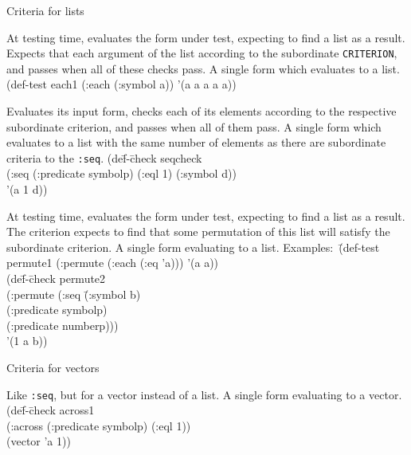 \begin{criteriaGroup}{Criteria for lists}{}

{At testing time, evaluates the form under test, expecting to find a
  list as a result.  Expects that each argument of the list according
  to the subordinate \texttt{CRITERION}, and passes when all of these
  checks pass.}
{A single form which evaluates to a list.}
{\noExpl}
{\singleEx}
{(def-test each1 (:each (:symbol a)) '(a a a a a))}

{Evaluates its input form, checks each of its elements according to
  the respective subordinate criterion, and passes when all of them
  pass.}
{A single form which evaluates to a list with the same number of
elements as there are subordinate criteria to the
\texttt{:seq}.}
{}
{\tabbingEx}{
(de\=f-\=check seqcheck
\\ \>\>  (:seq (:predicate symbolp) (:eql 1) (:symbol d))
\\ \>  '(a 1 d))
}

{At testing time, evaluates the form under test, expecting to find a
  list as a result.  The criterion expects to find that some
  permutation of this list will satisfy the subordinate criterion.}
{A single form evaluating to a list.}
{\noExpl}{\tabbingEx}{
\textrm{Examples:}\ \=(def-test permute1 (:permute (:each (:eq 'a))) '(a a))
\\ \> (de\=f-\=check permute2
\\ \> \> \> (:permute (:seq \=(:symbol b)
\\ \> \> \>             \>(:predicate symbolp)
\\ \> \> \>             \>(:predicate numberp)))
\\ \> \>'(1 a b))
}

\end{criteriaGroup}

\begin{criteriaGroup}{Criteria for vectors}{}

{Like \texttt{:seq}, but for a vector instead of a list.}
{A single form evaluating to a vector.}
{\noExpl}{\tabbingEx}{
(de\=f-\=check across1
\\ \>\>  (:across (:predicate symbolp) (:eql 1))
\\ \>  (vector 'a 1))}

\end{criteriaGroup}

